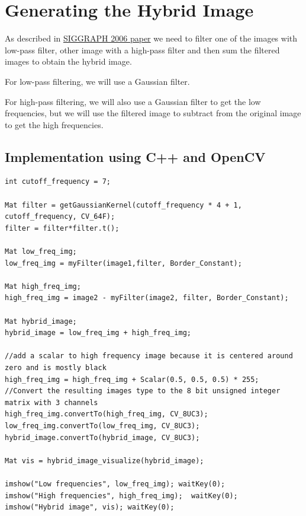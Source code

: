 \documentclass{article}
\begin{document}
\newpage
\section{Generating the Hybrid Image }


As described in \href{http://cvcl.mit.edu/publications/OlivaTorralb_Hybrid_Siggraph06.pdf}{SIGGRAPH 2006 paper} we need to filter one of the images with low-pass filter, other image with a high-pass filter and then sum the filtered images to obtain the hybrid image.

For low-pass filtering, we will use a Gaussian filter.

For high-pass filtering, we will also use a Gaussian filter to get the low frequencies, but we will use the filtered image to subtract from the original image to get the high frequencies.

\subsection{Implementation using C++ and OpenCV}
\begin{lstlisting}[caption={Code for generating the hybrid image.},captionpos=b]
int cutoff_frequency = 7;

Mat filter = getGaussianKernel(cutoff_frequency * 4 + 1, cutoff_frequency, CV_64F);
filter = filter*filter.t();

Mat low_freq_img;
low_freq_img = myFilter(image1,filter, Border_Constant);

Mat high_freq_img;
high_freq_img = image2 - myFilter(image2, filter, Border_Constant);

Mat hybrid_image;
hybrid_image = low_freq_img + high_freq_img;

//add a scalar to high frequency image because it is centered around zero and is mostly black	
high_freq_img = high_freq_img + Scalar(0.5, 0.5, 0.5) * 255;
//Convert the resulting images type to the 8 bit unsigned integer matrix with 3 channels
high_freq_img.convertTo(high_freq_img, CV_8UC3);
low_freq_img.convertTo(low_freq_img, CV_8UC3);
hybrid_image.convertTo(hybrid_image, CV_8UC3);

Mat vis = hybrid_image_visualize(hybrid_image);

imshow("Low frequencies", low_freq_img); waitKey(0);
imshow("High frequencies", high_freq_img);	waitKey(0);
imshow("Hybrid image", vis); waitKey(0);
\end{lstlisting}

\newpage
\end{document}

